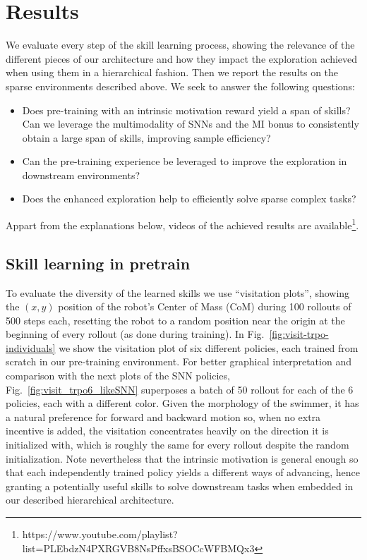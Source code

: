\documentclass{article} %
\begin{document}
\section{Results}

We evaluate every step of the skill learning process, showing the relevance of the different pieces of our architecture and how they impact the exploration achieved when using them in a hierarchical fashion. Then we report the results on the sparse environments described above. We seek to answer the following questions:
\begin{itemize}
    \item Does pre-training with an intrinsic motivation reward yield a span of skills? Can we leverage the multimodality of SNNs and the MI bonus to consistently obtain a large span of skills, improving sample efficiency? 
    \item Can the pre-training experience be leveraged to improve the exploration in downstream environments?
    \item Does the enhanced exploration help to efficiently solve sparse complex tasks?
\end{itemize}
Appart from the explanations below, videos of the achieved results are available\footnote{https://www.youtube.com/playlist?list=PLEbdzN4PXRGVB8NsPffxsBSOCcWFBMQx3}.

\subsection{Skill learning in pretrain}

To evaluate the diversity of the learned skills we use ``visitation plots'', showing the $(x,y)$ position of the robot's Center of Mass (CoM) during 100 rollouts of 500 steps each, resetting the robot to a random position near the origin at the beginning of every rollout (as done during training). In Fig.\ \ref{fig:visit-trpo-individuals} we show the visitation plot of six different policies, each trained from scratch in our pre-training environment. For better graphical interpretation and comparison with the next plots of the SNN policies, Fig.\ \ref{fig:visit_trpo6_likeSNN} superposes a batch of 50 rollout for each of the 6 policies, each with a different color. Given the morphology of the swimmer, it has a natural preference for forward and backward motion so, when no extra incentive is added, the visitation concentrates heavily on the direction it is initialized with, which is roughly the same for every rollout despite the random initialization. Note nevertheless that the intrinsic motivation is general enough so that each independently trained policy yields a different ways of advancing, hence granting a potentially useful skills to solve downstream tasks when embedded in our described hierarchical architecture.
\end{document}
